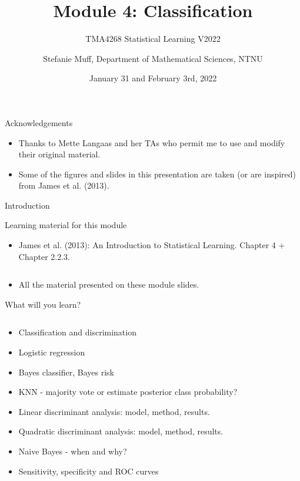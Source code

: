 \documentclass[10pt,ignorenonframetext,]{beamer}
\title{Module 4: Classification}
\subtitle{TMA4268 Statistical Learning V2022}
\author{Stefanie Muff, Department of Mathematical Sciences, NTNU}
\date{January 31 and February 3rd, 2022}
\providecommand{\tightlist}{%
  \setlength{\itemsep}{0pt}\setlength{\parskip}{0pt}}
\begin{document}
\frame{\titlepage}

\begin{frame}{Acknowledgements}
\protect\hypertarget{acknowledgements}{}

\begin{itemize}
\item
  Thanks to Mette Langaas and her TAs who permit me to use and modify
  their original material.
\item
  Some of the figures and slides in this presentation are taken (or are
  inspired) from James et al. (2013).
\end{itemize}

\end{frame}

\begin{frame}{Introduction}
\protect\hypertarget{introduction}{}

\begin{block}{Learning material for this module}

\vspace{2mm}

\begin{itemize}
\tightlist
\item
  James et al. (2013): An Introduction to Statistical Learning. Chapter
  4 + Chapter 2.2.3.
\end{itemize}

\(~\)

\begin{itemize}
\tightlist
\item
  All the material presented on these module slides.
\end{itemize}

\end{block}

\end{frame}

\begin{frame}

\begin{block}{What will you learn?}

\(~\)

\begin{itemize}
\item
  Classification and discrimination
\item
  Logistic regression
\item
  Bayes classifier, Bayes risk
\item
  KNN - majority vote or estimate posterior class probability?
\item
  Linear discriminant analysis: model, method, results.
\item
  Quadratic discriminant analysis: model, method, results.
\item
  Naive Bayes - when and why?
\item
  Sensitivity, specificity and ROC curves
\end{itemize}

\end{block}

\end{frame}
\end{document}

